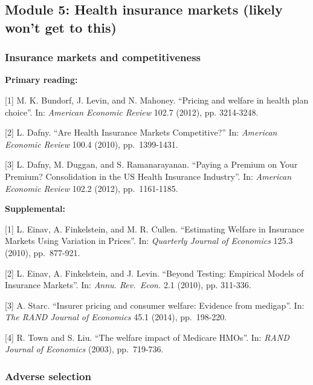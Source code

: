 \documentclass[11pt,]{article}
\begin{document}
\hypertarget{module-5-health-insurance-markets-likely-wont-get-to-this}{%
\subsection{Module 5: Health insurance markets (likely won't get to
this)}\label{module-5-health-insurance-markets-likely-wont-get-to-this}}

\hypertarget{insurance-markets-and-competitiveness}{%
\subsubsection{Insurance markets and
competitiveness}\label{insurance-markets-and-competitiveness}}

\textbf{Primary reading:}

{[}1{]} M. K. Bundorf, J. Levin, and N. Mahoney. ``Pricing and welfare
in health plan choice''. In: \emph{American Economic Review} 102.7
(2012), pp. 3214-3248.

{[}2{]} L. Dafny. ``Are Health Insurance Markets Competitive?'' In:
\emph{American Economic Review} 100.4 (2010), pp.~1399-1431.

{[}3{]} L. Dafny, M. Duggan, and S. Ramanarayanan. ``Paying a Premium on
Your Premium? Consolidation in the US Health Insurance Industry''. In:
\emph{American Economic Review} 102.2 (2012), pp.~1161-1185.

\textbf{Supplemental:}

{[}1{]} L. Einav, A. Finkelstein, and M. R. Cullen. ``Estimating Welfare
in Insurance Markets Using Variation in Prices''. In: \emph{Quarterly
Journal of Economics} 125.3 (2010), pp.~877-921.

{[}2{]} L. Einav, A. Finkelstein, and J. Levin. ``Beyond Testing:
Empirical Models of Insurance Markets''. In: \emph{Annu. Rev.~Econ.} 2.1
(2010), pp. 311-336.

{[}3{]} A. Starc. ``Insurer pricing and consumer welfare: Evidence from
medigap''. In: \emph{The RAND Journal of Economics} 45.1 (2014),
pp.~198-220.

{[}4{]} R. Town and S. Liu. ``The welfare impact of Medicare HMOs''. In:
\emph{RAND Journal of Economics} (2003), pp.~719-736.

\hypertarget{adverse-selection}{%
\subsubsection{Adverse selection}\label{adverse-selection}}
\end{document}
